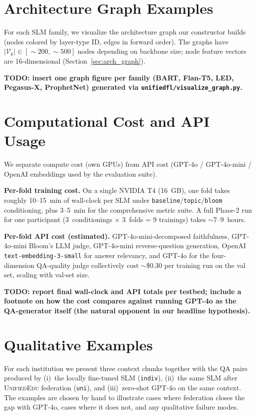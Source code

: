 \documentclass[11pt]{article}
\theoremstyle{plain}
\theoremstyle{definition}
\theoremstyle{remark}
\newcommand{\red}[1]{\textcolor{myred}{\textbf{#1}}}
\newcommand{\UniEdu}{\textsc{UnifiedEdu}}
\begin{document}
\section{Architecture Graph Examples}
\label{app:graph_examples}

For each SLM family, we visualize the architecture
graph our constructor builds (nodes colored by
layer-type ID, edges in forward order). The graphs
have $|\mathcal{V}_k| \in [\sim\!200, \sim\!500]$
nodes depending on backbone size; node feature
vectors are 16-dimensional (Section~\ref{sec:arch_graph}).

\red{TODO: insert one graph figure per family (BART, Flan-T5, LED, Pegasus-X, ProphetNet) generated via \texttt{unifiedfl/visualize\_graph.py}.}

\section{Computational Cost and API Usage}
\label{app:cost}

We separate compute cost (own GPUs) from API cost
(GPT-4o / GPT-4o-mini / OpenAI embeddings used by the
evaluation suite).

\textbf{Per-fold training cost.} On a single
NVIDIA T4 (16~GB), one fold takes roughly 10--15~min
of wall-clock per SLM under
\texttt{baseline}/\texttt{topic}/\texttt{bloom}
conditioning, plus 3--5~min for the comprehensive
metric suite. A full Phase-2 run for one
participant (3~conditionings $\times$ 3~folds = 9
trainings) takes $\sim 7$--9~hours.

\textbf{Per-fold API cost (estimated).}
GPT-4o-mini-decomposed faithfulness, GPT-4o-mini
Bloom's LLM judge, GPT-4o-mini reverse-question
generation, OpenAI \texttt{text-embedding-3-small}
for answer relevancy, and GPT-4o for the
four-dimension QA-quality judge collectively cost
$\sim$\$0.30 per training run on the val set, scaling
with val-set size.

\red{TODO: report final wall-clock and API totals per testbed; include a footnote on how the cost compares against running GPT-4o as the QA-generator itself (the natural opponent in our headline hypothesis).}

\section{Qualitative Examples}
\label{app:qualitative}

For each institution we present three context
chunks together with the QA pairs produced by
(i)~the locally fine-tuned SLM (\texttt{indiv}),
(ii)~the same SLM after \UniEdu{} federation
(\texttt{uni}), and (iii)~zero-shot GPT-4o on the
same context. The examples are chosen by
hand to illustrate cases where federation closes the
gap with GPT-4o, cases where it does not, and any
qualitative failure modes.
\end{document}
